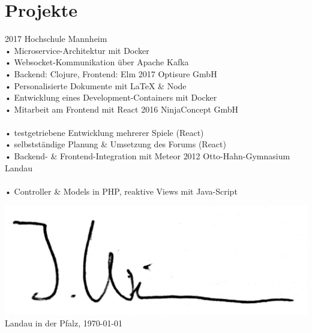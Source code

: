\documentclass[
]{friggeri-cv}
\begin{document}
\section{Projekte}

\begin{entrylist}
  \entry
    {2017}
    {}
    {Hochschule Mannheim}
    {\\%
      • Microservice-Architektur mit Docker\\
      • Websocket-Kommunikation über Apache Kafka\\
      • Backend: Clojure, Frontend: Elm
    }
  \entry
    {2017}
    {}
    {Optisure GmbH}
    {\\%
      • Personalisierte Dokumente mit \LaTeX{} \& Node\\
      • Entwicklung eines Development-Containers mit Docker\\
      • Mitarbeit am Frontend mit React
    }
  \entry
    {2016}
    {}
    {NinjaConcept GmbH}
    {\\\\%
      • testgetriebene Entwicklung mehrerer Spiele (React)\\
      • selbstständige Planung \& Umsetzung des Forums (React)\\
      • Backend- \& Frontend-Integration mit Meteor
    }
  \entry
    {2012}
    {}
    {Otto-Hahn-Gymnasium Landau}
    {\\\\%
      • Controller \& Models in PHP, reaktive Views mit Java-Script
    }
\end{entrylist}
\vspace*{-.2cm}
\includegraphics[width=.3\textwidth]{signature.pdf}\\
{\footnotesize
  Landau in der Pfalz, \daymonthyeardate\today
}
\end{document}
